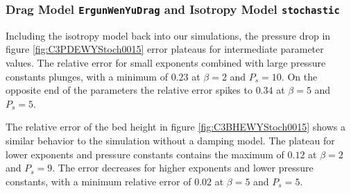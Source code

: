 



\subsubsection{Drag Model \lstinline|ErgunWenYuDrag| and Isotropy Model \lstinline|stochastic|}



Including the isotropy model back into our simulations, the pressure drop in figure \ref{fig:C3PDEWYStoch0015} error plateaus for intermediate parameter values.
The relative error for small exponents combined with large pressure constants plunges, with a minimum of $0.23$ at $\beta = 2$ and $P_s = 10$.
On the opposite end of the parameters the relative error spikes to $0.34$ at $\beta = 5$ and $P_s = 5$.


The relative error of the bed height in figure \ref{fig:C3BHEWYStoch0015} shows a similar behavior to the simulation without a damping model.
The plateau for lower exponents and pressure constants contains the maximum of $0.12$ at $\beta = 2$ and $P_s = 9$.
The error decreases for higher exponents and lower pressure constants, with a minimum relative error of $0.02$ at $\beta = 5$ and $P_s = 5$.


